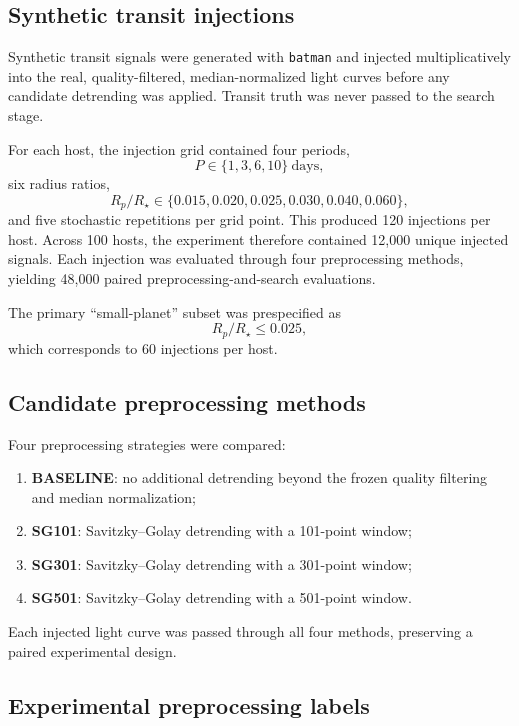\documentclass[10pt,twocolumn]{article}
\begin{document}
\subsection{Synthetic transit injections}

Synthetic transit signals were generated with \texttt{batman} \cite{kreidberg2015} and injected multiplicatively into the real, quality-filtered, median-normalized light curves before any candidate detrending was applied. Transit truth was never passed to the search stage.

For each host, the injection grid contained four periods,
\[
P \in \{1,3,6,10\}\ \mathrm{days},
\]
six radius ratios,
\[
R_p/R_\star \in \{0.015,0.020,0.025,0.030,0.040,0.060\},
\]
and five stochastic repetitions per grid point. This produced 120 injections per host. Across 100 hosts, the experiment therefore contained 12,000 unique injected signals. Each injection was evaluated through four preprocessing methods, yielding 48,000 paired preprocessing-and-search evaluations.

The primary ``small-planet'' subset was prespecified as
\[
R_p/R_\star \leq 0.025,
\]
which corresponds to 60 injections per host.

\subsection{Candidate preprocessing methods}

Four preprocessing strategies were compared:

\begin{enumerate}[leftmargin=1.2em,itemsep=1pt]
    \item \textbf{BASELINE}: no additional detrending beyond the frozen quality filtering and median normalization;
    \item \textbf{SG101}: Savitzky--Golay detrending with a 101-point window;
    \item \textbf{SG301}: Savitzky--Golay detrending with a 301-point window;
    \item \textbf{SG501}: Savitzky--Golay detrending with a 501-point window.
\end{enumerate}

Each injected light curve was passed through all four methods, preserving a paired experimental design.

\subsection{Experimental preprocessing labels}
\end{document}
